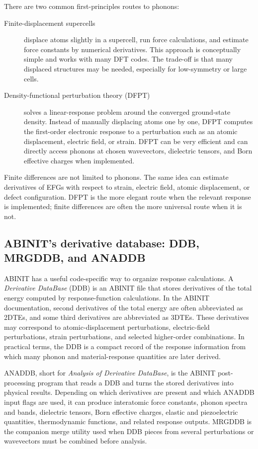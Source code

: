\documentclass[11pt]{article}
\begin{document}
There are two common first-principles routes to phonons:
\begin{description}
\item[Finite-displacement supercells] displace atoms slightly in a supercell, run force calculations, and estimate force constants by numerical derivatives.  This approach is conceptually simple and works with many DFT codes.  The trade-off is that many displaced structures may be needed, especially for low-symmetry or large cells.
\item[Density-functional perturbation theory (DFPT)] solves a linear-response problem around the converged ground-state density.  Instead of manually displacing atoms one by one, DFPT computes the first-order electronic response to a perturbation such as an atomic displacement, electric field, or strain.  DFPT can be very efficient and can directly access phonons at chosen wavevectors, dielectric tensors, and Born effective charges when implemented.
\end{description}

Finite differences are not limited to phonons.  The same idea can estimate derivatives of EFGs with respect to strain, electric field, atomic displacement, or defect configuration.  DFPT is the more elegant route when the relevant response is implemented; finite differences are often the more universal route when it is not.

\subsection{ABINIT's derivative database: DDB, MRGDDB, and ANADDB}

ABINIT has a useful code-specific way to organize response calculations.  A \emph{Derivative DataBase} (DDB) is an ABINIT file that stores derivatives of the total energy computed by response-function calculations.  In the ABINIT documentation, second derivatives of the total energy are often abbreviated as 2DTEs, and some third derivatives are abbreviated as 3DTEs.  These derivatives may correspond to atomic-displacement perturbations, electric-field perturbations, strain perturbations, and selected higher-order combinations.  In practical terms, the DDB is a compact record of the response information from which many phonon and material-response quantities are later derived.\cite{ABINIT_RESPFN,ABINIT_DFPTTopic}

ANADDB, short for \emph{Analysis of Derivative DataBase}, is the ABINIT post-processing program that reads a DDB and turns the stored derivatives into physical results.  Depending on which derivatives are present and which ANADDB input flags are used, it can produce interatomic force constants, phonon spectra and bands, dielectric tensors, Born effective charges, elastic and piezoelectric quantities, thermodynamic functions, and related response outputs.  MRGDDB is the companion merge utility used when DDB pieces from several perturbations or wavevectors must be combined before analysis.\cite{ABINIT_ANADDB,ABINIT_PHONONS}
\end{document}
